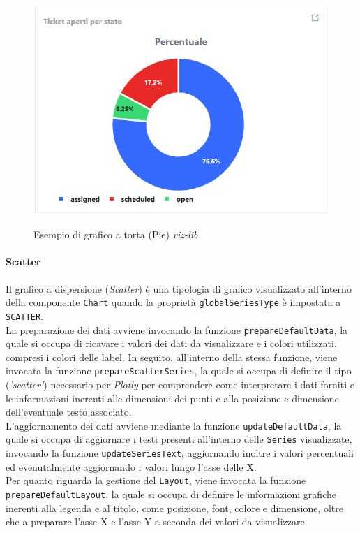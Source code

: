 \begin{figure}[H]
    \centering
    \includegraphics[alt={Esempio di grafico a torta viz-lib}, width=0.8 \columnwidth, height=\maxdimen, keepaspectratio]{img/ex_pie.png}
    \caption{Esempio di grafico a torta (Pie) \textit{viz-lib}}
    \label{fig:pie-example}
\end{figure}

\paragraph{Scatter}
Il grafico a dispersione (\textit{Scatter}) è una tipologia di grafico visualizzato all'interno della componente \texttt{Chart} quando la proprietà \texttt{globalSeriesType} è impostata a \texttt{SCATTER}. \\
La preparazione dei dati avviene invocando la funzione \texttt{prepareDefaultData}, la quale si occupa di ricavare i valori dei dati da visualizzare e i colori utilizzati, compresi i
colori delle label. In seguito, all'interno della stessa funzione, viene invocata la funzione \texttt{prepareScatterSeries}, la quale si occupa di definire il tipo (\textit{'scatter'}) necessario per \textit{Plotly}
per comprendere come interpretare i dati forniti e le informazioni inerenti alle dimensioni dei punti e alla posizione e dimensione dell'eventuale testo associato. \\
L'aggiornamento dei dati avviene mediante la funzione \texttt{updateDefaultData}, la quale si occupa di aggiornare i testi presenti all'interno delle \texttt{Series} visualizzate, invocando la funzione
\texttt{updateSeriesText}, aggiornando inoltre i valori percentuali ed evenutalmente aggiornando i valori lungo l'asse delle X. \\
Per quanto riguarda la gestione del \texttt{Layout}, viene invocata la funzione \texttt{prepareDefaultLayout}, la quale si occupa di definire le informazioni grafiche inerenti alla legenda e al titolo, come posizione,
font, colore e dimensione, oltre che a preparare l'asse X e l'asse Y a seconda dei valori da visualizzare.

